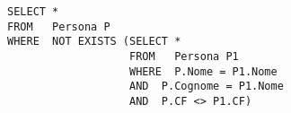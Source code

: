 \begin{lstlisting}
SELECT *
FROM   Persona P
WHERE  NOT EXISTS (SELECT *
                   FROM   Persona P1
                   WHERE  P.Nome = P1.Nome
                   AND  P.Cognome = P1.Nome
                   AND  P.CF <> P1.CF)
\end{lstlisting}
